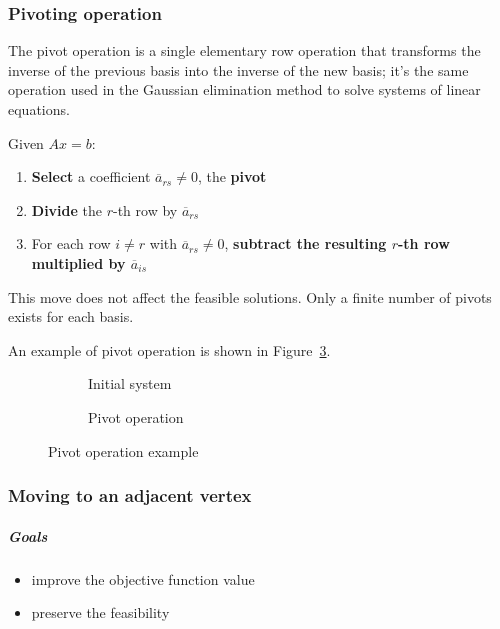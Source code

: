 \documentclass[english]{article}
\begin{document}
\subsubsection{Pivoting operation}

The pivot operation is a single elementary row operation that transforms the inverse of the previous basis into the inverse of the new basis;
it's the same operation used in the Gaussian elimination method to solve systems of linear equations.

\bigskip
Given \(Ax = b\):

\begin{enumerate}
  \item \textbf{Select} a coefficient \(\overline{a}_{rs} \neq 0\), the \textbf{pivot}
  \item \textbf{Divide} the \(r\)-th row by \(\overline{a}_{rs}\)
  \item For each row \(i \neq r\) with \(\overline{a}_{rs} \neq 0\), \textbf{subtract the resulting \(r\)-th row multiplied by \(\overline{a}_{is}\)}
\end{enumerate}

This move does not affect the feasible solutions.
Only a finite number of pivots exists for each basis.

\bigskip
An example of pivot operation is shown in Figure~\ref{fig:pivot-operation-example}.

\begin{figure}[htbp]
  \centering
  \bigskip
  \begin{subfigure}[b]{0.495\textwidth}
    \centering
    \bigskip
    \caption{Initial system}
    \label{fig:pivot-operation-example-1}
    \bigskip
  \end{subfigure}
  \begin{subfigure}[b]{0.495\textwidth}
    \centering
    \bigskip
    \caption{Pivot operation}
    \bigskip
    \label{fig:pivot-operation-example-2}
  \end{subfigure}

  \caption{Pivot operation example}
  \label{fig:pivot-operation-example}
  \bigskip
\end{figure}

\subsubsection{Moving to an adjacent vertex}

\subparagraph*{Goals}
\begin{itemize}[label=\(\rightarrow\)]
  \item improve the objective function value
  \item preserve the feasibility
\end{itemize}
\end{document}
